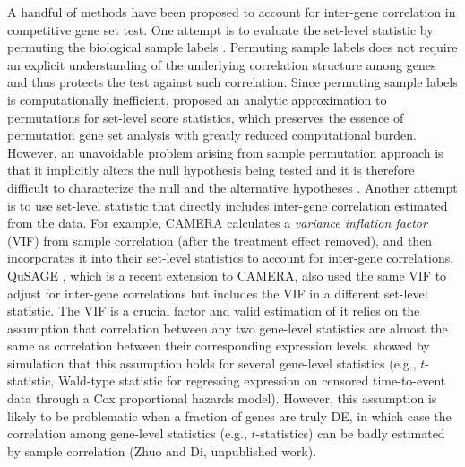 \documentclass[a4,center,fleqn]{NAR}
\newcommand{\thepapertobefinished}{Zhuo and Di, unpublished work}
\begin{document}
	A handful of methods have been proposed to account for inter-gene correlation in competitive gene
	set test. One attempt is to evaluate the set-level statistic by permuting the biological sample
	labels \citep{subramanian2005gene, efron2007testing}. Permuting sample labels
	does not require an explicit understanding of the underlying correlation structure among genes and
	thus protects the test against such correlation. Since permuting sample labels is computationally
	inefficient, \cite{zhou2013empirical} proposed an analytic approximation to permutations for
	set-level score statistics, which preserves the essence of permutation gene set analysis with
	greatly reduced computational burden. However, an unavoidable problem arising from sample
	permutation approach is that it implicitly alters the null hypothesis being tested and it is
	therefore difficult to characterize the null and the alternative hypotheses
	\citep{goeman2007analyzing, khatri2012ten, wu2012camera}. Another attempt is to use set-level
	statistic that directly includes inter-gene correlation estimated from the data. For example, CAMERA
	\citep{wu2012camera} calculates a \textit{variance inflation factor} (VIF) from sample correlation
	(after the treatment effect removed), and then incorporates it into their set-level statistics to
	account for inter-gene correlations. QuSAGE \citep{yaari2013quantitative}, which is a recent
	extension to CAMERA, also used the same VIF to adjust for inter-gene correlations but includes the
	VIF in a different set-level statistic. The VIF is a crucial factor and valid estimation of it
	relies on the assumption that correlation between any two gene-level statistics are almost the same as
	correlation between their corresponding expression levels. \citet{barry2008statistical} showed by simulation
	that this assumption holds for several gene-level statistics
	(e.g., $t$-statistic, Wald-type statistic for regressing expression on censored time-to-event data
	through a Cox proportional hazards model). However, this assumption is likely to be problematic when a fraction of genes are 
	truly DE, in which case the correlation among gene-level
	statistics (e.g., $t$-statistics) can be badly estimated by sample correlation (\thepapertobefinished). 
	
	
	
\end{document}
